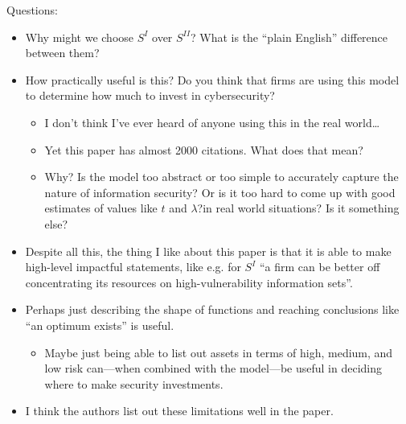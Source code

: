 \documentclass[11pt]{article}
\begin{document}
Questions:
\begin{itemize}
    \item Why might we choose $S^I$ over $S^{II}$? What is the ``plain English'' difference between them?
    \item How practically useful is this? Do you think that firms are using this model to determine how much to invest in cybersecurity?
    \begin{itemize}
        \item I don't think I've ever heard of anyone using this in the real world\dots
        \item Yet this paper has almost 2000 citations. What does that mean?
        \item Why? Is the model too abstract or too simple to accurately capture the nature of information security? Or is it too hard to come up with good estimates of values like $t$ and $\lambda$?in real world situations? Is it something else?
    \end{itemize}
    \item Despite all this, the thing I like about this paper is that it is able to make high-level impactful statements, like e.g. for $S^I$ ``a firm can be better off concentrating its resources on high-vulnerability information sets''.
    \item Perhaps just describing the shape of functions and reaching conclusions like ``an optimum exists'' is useful. 
    \begin{itemize}
        \item Maybe just being able to list out assets in terms of high, medium, and low risk can---when combined with the model---be useful in deciding where to make security investments.
    \end{itemize}
    \item I think the authors list out these limitations well in the paper.
\end{itemize}
\end{document}
